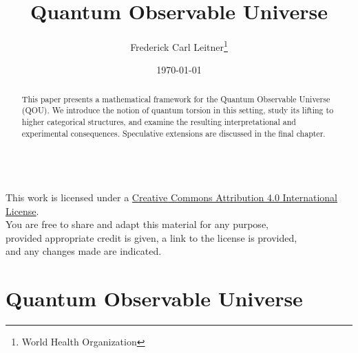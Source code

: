\documentclass[12pt,a4paper]{report}
\title{Quantum Observable Universe}
\author{Frederick Carl Leitner\thanks{World Health Organization}}
\date{\today}
\begin{document}
\maketitle

\thispagestyle{empty}
\vspace*{\fill}
\begin{center}
  \ccby\\[0.5em]
  This work is licensed under a
  \href{https://creativecommons.org/licenses/by/4.0/}{Creative Commons Attribution 4.0 International License}.\\[0.3em]
  You are free to share and adapt this material for any purpose,\\
  provided appropriate credit is given, a link to the license is provided,\\
  and any changes made are indicated.
\end{center}
\vspace*{\fill}

\tableofcontents

\begin{abstract}
This paper presents a mathematical framework for the Quantum Observable
Universe (QOU).  We introduce the notion of quantum torsion in this setting,
study its lifting to higher categorical structures, and examine the resulting
interpretational and experimental consequences.  Speculative extensions are
discussed in the final chapter.
\end{abstract}

\chapter{Quantum Observable Universe}
\label{chap:qou}
\end{document}
